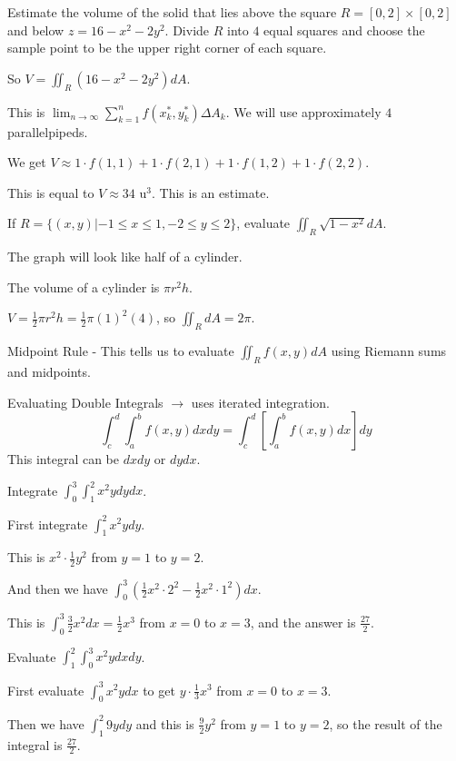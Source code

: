 \documentclass[../calc3.tex]{subfiles}
\begin{document}
\begin{example}
    Estimate the volume of the solid that lies above the square $R=[0,2]\times [0,2]$ and below $z=16-x^2-2y^2$. Divide $R$ into $4$ equal squares and choose the sample point to be the upper right corner of each square.

    So $V=\iint_R (16-x^2-2y^2)dA$.

    This is $\lim_{n\to\infty}\sum_{k=1}^n f(x_k^*,y_k^*)\Delta A_k$. We will use approximately $4$ parallelpipeds.

    We get $V\approx 1\cdot f(1,1)+1\cdot f(2,1)+1\cdot f(1,2)+1\cdot f(2,2)$.

    This is equal to $V\approx 34$ u$^3$. This is an estimate.
\end{example}

\begin{example}
    If $R=\{ (x,y)|-1\leq x\leq 1, -2\leq y\leq 2\}$, evaluate $\iint_R \sqrt{1-x^2}dA$.

    The graph will look like half of a cylinder.

    The volume of a cylinder is $\pi r^2 h$.

    $V=\frac{1}{2}\pi r^2 h=\frac{1}{2}\pi (1)^2(4)$, so $\iint_R dA=2\pi$.
\end{example}

Midpoint Rule - This tells us to evaluate $\iint_R f(x,y)dA$ using Riemann sums and midpoints.

Evaluating Double Integrals $\rightarrow$ uses iterated integration.
\[ \int_c^d \int_a^b f(x,y)dx dy = \int_c^d \left[ \int_a^b f(x,y)dx\right]dy \]
This integral can be $dxdy$ or $dydx$.

\begin{example}
    Integrate $\int_0^3 \int_1^2 x^2y dy dx$.

    First integrate $\int_1^2 x^2ydy$.

    This is $x^2\cdot \frac{1}{2}y^2$ from $y=1$ to $y=2$.

    And then we have $\int_0^3 \left(\frac{1}{2}x^2\cdot 2^2-\frac{1}{2}x^2\cdot 1^2\right)dx$.

    This is $\int_0^3 \frac{3}{2}x^2 dx = \frac{1}{2}x^3$ from $x=0$ to $x=3$, and the answer is $\frac{27}{2}$.
\end{example}

\begin{example}
    Evaluate $\int_1^2 \int_0^3 x^2 ydxdy$.

    First evaluate $\int_0^3 x^2y dx$ to get $y\cdot \frac{1}{3}x^3$ from $x=0$ to $x=3$.

    Then we have $\int_1^2 9y dy$ and this is $\frac{9}{2}y^2$ from $y=1$ to $y=2$, so the result of the integral is $\frac{27}{2}$.
\end{example}
\end{document}
